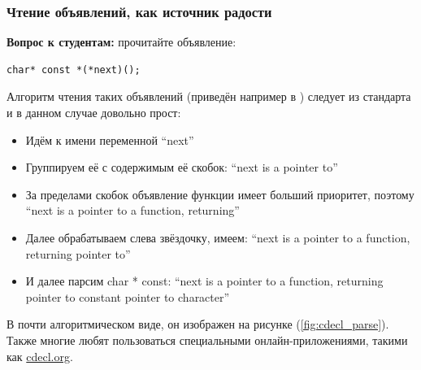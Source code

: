 \documentclass[a4paper,12pt,oneside]{article}
\newif\ifanswers
\begin{document}
\ifanswers
Правильный ответ: константность означает, что оттуда можно только читать. При этом волатильность означает, что чтения оттуда нельзя переупорядочивать. Интересно, что здесь \lstinline!const! это по сути способ сказать \lstinline!readonly!, чем семантически выразить неизменность данных.
\fi

\subsubsection{Чтение объявлений, как источник радости}\label{AlgDecl}

\textbf{Вопрос к студентам:} прочитайте объявление:

\begin{lstlisting}
char* const *(*next)();
\end{lstlisting}

\ifanswers
Правильный ответ: указатель на функцию, возвращающую указатель на константный указатель на символ.
\fi

Алгоритм чтения таких объявлений (приведён например в \cite{linden}) следует из стандарта и в данном случае довольно прост:

\begin{itemize}
\item
Идём к имени переменной ``next''
\item
Группируем её с содержимым её скобок: ``next is a pointer to''
\item
За пределами скобок объявление функции имеет больший приоритет, поэтому ``next is a pointer to a function, returning''
\item
Далее обрабатываем слева звёздочку, имеем: ``next is a pointer to a function, returning pointer to''
\item
И далее парсим char * const: ``next is a pointer to a function, returning pointer to constant pointer to character''
\end{itemize}

В почти алгоритмическом виде, он изображен на рисунке (\ref{fig:cdecl_parse}). Также многие любят пользоваться специальными онлайн-приложениями, такими как \url{cdecl.org}.
\end{document}
